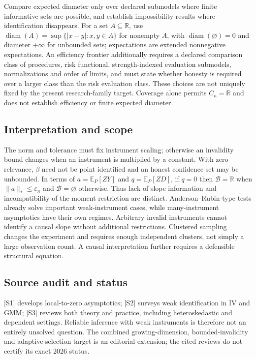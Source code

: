 \documentclass[11pt,a4paper]{article}
\begin{document}
Compare expected diameter only over declared submodels where finite informative sets are possible, and establish impossibility results where identification disappears. For a set $A\subseteq\mathbb R$, use $\operatorname{diam}(A)=\sup\{|x-y|:x,y\in A\}$ for nonempty $A$, with $\operatorname{diam}(\varnothing)=0$ and diameter $+\infty$ for unbounded sets; expectations are extended nonnegative expectations. An efficiency frontier additionally requires a declared comparison class of procedures, risk functional, strength-indexed evaluation submodels, normalizations and order of limits, and must state whether honesty is required over a larger class than the risk evaluation class. These choices are not uniquely fixed by the present research-family target. Coverage alone permits $C_n=\mathbb R$ and does not establish efficiency or finite expected diameter.

\subsection*{Interpretation and scope}

The norm and tolerance must fix instrument scaling; otherwise an invalidity bound changes when an instrument is multiplied by a constant. With zero relevance, $\beta$ need not be point identified and an honest confidence set may be unbounded. In terms of $a=\mathbb E_P[ZY]$ and $q=\mathbb E_P[ZD]$, if $q=0$ then $\mathcal B=\mathbb R$ when $\|a\|_*\leq\varepsilon_n$ and $\mathcal B=\varnothing$ otherwise. Thus lack of slope information and incompatibility of the moment restriction are distinct. Anderson--Rubin-type tests already solve important weak-instrument cases, while many-instrument asymptotics have their own regimes. Arbitrary invalid instruments cannot identify a causal slope without additional restrictions. Clustered sampling changes the experiment and requires enough independent clusters, not simply a large observation count. A causal interpretation further requires a defensible structural equation.

\subsection*{Source audit and status}

[S1] develops local-to-zero asymptotics; [S2] surveys weak identification in IV and GMM; [S3] reviews both theory and practice, including heteroskedastic and dependent settings. Reliable inference with weak instruments is therefore not an entirely unsolved question. The combined growing-dimension, bounded-invalidity and adaptive-selection target is an editorial extension; the cited reviews do not certify its exact 2026 status.
\end{document}
